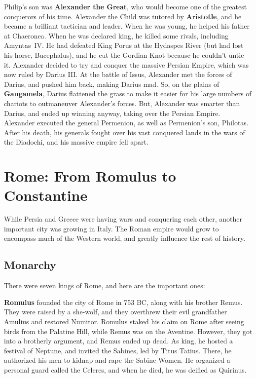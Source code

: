 Philip's son was \textbf{Alexander the Great}, who would become one of the greatest conquerors of his time.
Alexander the Child was tutored by \textbf{Aristotle}, and he became a brilliant tactician and leader.
When he was young, he helped his father at Chaeronea.
When he was declared king, he killed some rivals, including Amyntas~IV\@.
He had defeated King Porus at the Hydaspes River (but had lost his horse, Bucephalus),
and he cut the Gordian Knot because he couldn't untie it.
Alexander decided to try and conquer the massive Persian Empire, which was now ruled by Darius III\@.
At the battle of Issus, Alexander met the forces of Darius, and pushed him back, making Darius mad.
So, on the plains of \textbf{Gaugamela}, Darius flattened the grass to make it easier for his
large numbers of chariots to outmaneuver Alexander's forces.
But, Alexander was smarter than Darius, and ended up winning anyway, taking over the Persian Empire.
Alexander executed the general Permenion, as well as Permenion's son, Philotas.
After his death, his generals fought over his vast conquered lands in the wars of the Diadochi,
and his massive empire fell apart.

\section{Rome: From Romulus to Constantine}

While Persia and Greece were having wars and conquering each other, another important city was growing in Italy.
The Roman empire would grow to encompass much of the Western world,
and greatly influence the rest of history.

\subsection*{Monarchy}

There were seven kings of Rome, and here are the important ones:

\textbf{Romulus} founded the city of Rome in 753 BC, along with his brother Remus.
They were raised by a she-wolf, and they overthrew their evil grandfather Amulius and restored Numitor.
Romulus staked his claim on Rome after seeing birds from the Palatine Hill, while Remus was on the Aventine.
However, they got into a brotherly argument, and Remus ended up dead.
As king, he hosted a festival of Neptune, and invited the Sabines, led by Titus Tatius.
There, he authorized his men to kidnap and rape the Sabine Women.
He organized a personal guard called the Celeres,
and when he died, he was deified as Quirinus.

